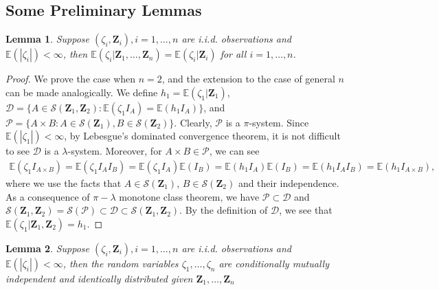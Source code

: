 \documentclass[11pt, preprint]{imsart}
\numberwithin{equation}{section}
\def \mcD{\mathcal{D}}
\def \mcP{\mathcal{P}}
\def \bfZ{\mathbf{Z}}
\def \ev{\mathbb{E}}
\theoremstyle{plain}
\newtheorem{lemma}{\indent Lemma}
\theoremstyle{definition}
\begin{document}
\subsection{Some Preliminary Lemmas}\label{sec:preliminary:lemma}
\begin{lemma}\label{prop:conditional:indpendence:1}
Suppose $(\zeta_i, \bfZ_i), i=1,\ldots, n$ are i.i.d. observations and $\ev(|\zeta_i|)<\infty$, then
$\ev(\zeta_i|\bfZ_1,\ldots, \bfZ_n)=\ev(\zeta_i|\bfZ_i)$ for all $i=1,\ldots, n$.
\end{lemma}
\begin{proof}
We prove the case when $n=2$, and the extension to the case of general $n$ can be made analogically. We define $h_1=\ev(\zeta_1 | \bfZ_1)$, $\mcD=\{A\in \mathcal{S}(\bfZ_1, \bfZ_2) : \ev(\zeta_1 I_A)=\ev(h_1I_A)\}$, and $\mcP=\{A\times B : A\in \mathcal{S}(\bfZ_1), B\in \mathcal{S}(\bfZ_2)\}$. Clearly, $\mcP$ is a $\pi$-system. Since $\ev(|\zeta_1|)<\infty$, by Lebesgue's dominated convergence theorem, it is not difficult to see $\mcD$ is a $\lambda$-system. Moreover, for $A\times B \in \mcP$, we can see
\begin{eqnarray}
	\ev(\zeta_1I_{A\times B})=\ev(\zeta_1I_{A}I_{B})=\ev(\zeta_1I_{A})\ev(I_B)=\ev(h_1I_A)\ev(I_B)=\ev(h_1I_AI_B)=\ev(h_1I_{A\times B}),\nonumber
\end{eqnarray}
where we use the facts that $A\in \mathcal{S}(\bfZ_1)$, $B\in \mathcal{S}(\bfZ_2)$ and their independence. As a consequence of $\pi-\lambda$ monotone class theorem, we have $\mcP\subset \mcD$ and $\mathcal{S}(\bfZ_1, \bfZ_2)=\mathcal{S}(\mcP)\subset \mcD\subset \mathcal{S}(\bfZ_1, \bfZ_2)$. By the definition of $\mcD$, we see that $\ev(\zeta_1 | \bfZ_1, \bfZ_2)=h_1$. 
\end{proof}
\begin{lemma}\label{prop:conditional:indpendence:2}
Suppose $(\zeta_i, \bfZ_i), i=1,\ldots, n$ are i.i.d. observations and $\ev(|\zeta_i|)<\infty$, then the random variables $\zeta_1,\ldots, \zeta_n$ are  conditionally mutually independent and identically distributed given $\bfZ_1,\ldots, \bfZ_n$
\end{lemma}
\end{document}
